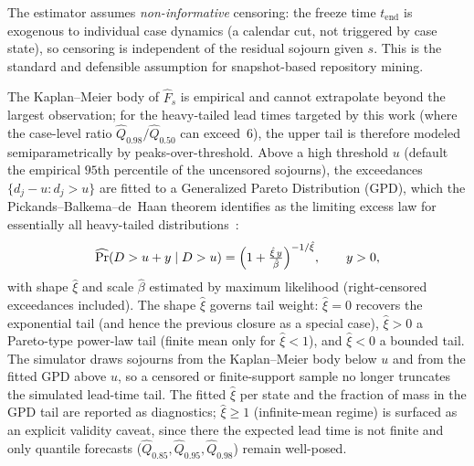\begin{remark}
\label{rem:censoring}
The estimator assumes \emph{non-informative} censoring: the freeze time
$t_{\text{end}}$ is exogenous to individual case dynamics (a calendar cut, not
triggered by case state), so censoring is independent of the residual sojourn
given $s$. This is the standard and defensible assumption for snapshot-based
repository mining.
\end{remark}

\begin{definition}
\label{def:tail-closure}
The Kaplan--Meier body of $\hat{F}_s$ is empirical and cannot extrapolate
beyond the largest observation; for the heavy-tailed lead times targeted by
this work (where the case-level ratio $\hat{Q}_{0.98}/\hat{Q}_{0.50}$ can
exceed~$6$), the upper tail is therefore modeled semiparametrically by
peaks-over-threshold. Above a high threshold $u$ (default the empirical
$95$th percentile of the uncensored sojourns), the exceedances
$\{d_j - u : d_j > u\}$ are fitted to a Generalized Pareto Distribution
(GPD), which the Pickands--Balkema--de~Haan theorem identifies as the
limiting excess law for essentially all heavy-tailed
distributions~\cite{coles2001introduction}:
\begin{equation}
\label{eq:gpd-tail}
\widehat{\Pr}(D > u + y \mid D > u) =
   \Bigl(1 + \tfrac{\hat{\xi}\,y}{\hat{\beta}}\Bigr)^{-1/\hat{\xi}},
   \qquad y > 0,
\end{equation}
with shape $\hat{\xi}$ and scale $\hat{\beta}$ estimated by maximum
likelihood (right-censored exceedances included). The shape $\hat{\xi}$
governs tail weight: $\hat{\xi}=0$ recovers the exponential tail (and hence
the previous closure as a special case), $\hat{\xi}>0$ a Pareto-type
power-law tail (finite mean only for $\hat{\xi}<1$), and $\hat{\xi}<0$ a
bounded tail. The simulator draws sojourns from the Kaplan--Meier body below
$u$ and from the fitted GPD above $u$, so a censored or finite-support sample
no longer truncates the simulated lead-time tail. The fitted $\hat{\xi}$ per
state and the fraction of mass in the GPD tail are reported as diagnostics;
$\hat{\xi}\geq 1$ (infinite-mean regime) is surfaced as an explicit validity
caveat, since there the expected lead time is not finite and only quantile
forecasts ($\hat{Q}_{0.85}, \hat{Q}_{0.95}, \hat{Q}_{0.98}$) remain
well-posed.
\end{definition}

